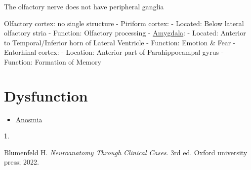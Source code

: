 \documentclass[
  letterpaper,
  DIV=11,
  numbers=noendperiod]{scrartcl}
\providecommand{\tightlist}{%
  \setlength{\itemsep}{0pt}\setlength{\parskip}{0pt}}\usepackage{longtable,booktabs,array}
\newlength{\cslhangindent}
\newlength{\csllabelwidth}
\newenvironment{CSLReferences}[2] %
 {\begin{list}{}{%
  \setlength{\itemindent}{0pt}
  \setlength{\leftmargin}{0pt}
  \setlength{\parsep}{0pt}
  \ifodd #1
   \setlength{\leftmargin}{\cslhangindent}
   \setlength{\itemindent}{-1\cslhangindent}
  \fi
  \setlength{\itemsep}{#2\baselineskip}}}
 {\end{list}}
\newcommand{\CSLLeftMargin}[1]{\parbox[t]{\csllabelwidth}{\strut#1\strut}}
\newcommand{\CSLRightInline}[1]{\parbox[t]{\linewidth - \csllabelwidth}{\strut#1\strut}}
\begin{document}
The olfactory nerve does not have peripheral ganglia

Olfactory cortex: no single structure - Piriform cortex: - Located:
Below lateral olfactory stria - Function: Olfactory processing -
\href{../../../../Alchemy\%20Archive/Neuro/Neuroanatomy/Limbic\%20System/amygdala.qmd}{Amygdala}:
- Located: Anterior to Temporal/Inferior horn of Lateral Ventricle -
Function: Emotion \& Fear - Entorhinal cortex: - Location: Anterior part
of Parahippocampal gyrus - Function: Formation of Memory

\section{Dysfunction}\label{dysfunction}

\begin{itemize}
\tightlist
\item
  \href{../../../../Alchemy\%20Archive/Symptoms/Neuro\%20Symptoms/anosmia.qmd}{Anosmia}
\end{itemize}

\label{refs}
\begin{CSLReferences}{0}{1}
\CSLLeftMargin{1. }%
\CSLRightInline{Blumenfeld H. \emph{Neuroanatomy Through Clinical
Cases}. 3rd ed. {Oxford university press}; 2022.}

\end{CSLReferences}
\end{document}
